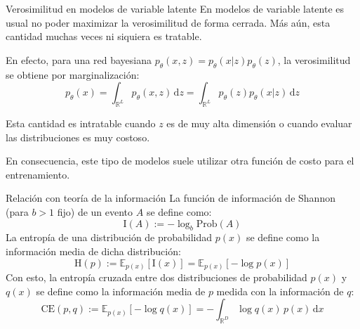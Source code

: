 \documentclass{beamer}
\newcommand{\R}{\mathbb{R}}
\begin{document}
\begin{frame}{Verosimilitud en modelos de variable latente}
    En modelos de variable latente es usual no poder maximizar la verosimilitud de forma cerrada. Más aún, esta cantidad muchas veces ni siquiera es tratable.

    En efecto, para una red bayesiana $p_\theta(x,z)=p_\theta(x|z)p_\theta(z)$, la verosimilitud se obtiene por marginalización:
    \begin{equation*}
        p_\theta(x)=\int_{\R^L} p_\theta(x,z)\,\text{d}z
        =\int_{\R^L} p_\theta(z)p_\theta(x|z)\,\text{d}z
    \end{equation*}

    Esta cantidad es intratable cuando $z$ es de muy alta dimensión o cuando evaluar las distribuciones es muy costoso.

    En consecuencia, este tipo de modelos suele utilizar otra función de costo para el entrenamiento.
\end{frame}

\begin{frame}{Relación con teoría de la información}
    La función de información de Shannon (para $b>1$ fijo) de un evento $A$ se define como:
    \begin{equation*}
        \text{I}(A):=-\log_b \text{Prob}(A)
    \end{equation*}
    La entropía de una distribución de probabilidad $p(x)$ se define como la información media de dicha distribución:
    \begin{equation*}
        \text{H}(p) := \mathbb{E}_{p(x)}\left[\text{I}(x)\right]=\mathbb{E}_{p(x)}\left[-\log p(x)\right]
    \end{equation*}
    Con esto, la entropía cruzada entre dos distribuciones de probabilidad $p(x)$ y $q(x)$ se define como la información media de $p$ medida con la información de $q$:
    \begin{equation*}
        \text{CE}(p,q) :=\mathbb{E}_{p(x)}\left[-\log q(x)\right]= -\int_{\R^D}\log q(x)\,p(x)\,\text{d}x
    \end{equation*}
\end{frame}
\end{document}
